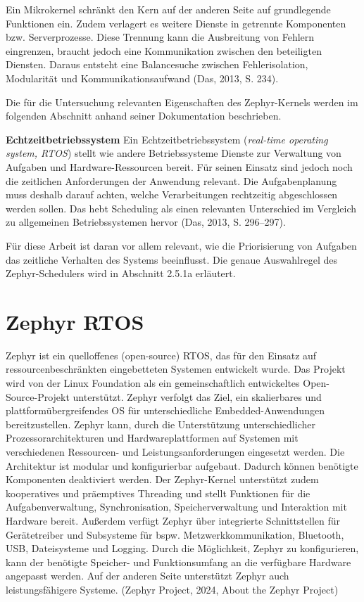 Ein Mikrokernel schr{\"a}nkt den Kern auf der anderen Seite auf grundlegende Funktionen ein. Zudem verlagert es weitere Dienste in getrennte Komponenten bzw. Serverprozesse. Diese Trennung kann die Ausbreitung von Fehlern eingrenzen, braucht jedoch eine Kommunikation zwischen den beteiligten Diensten. Daraus entsteht eine Balancesuche zwischen Fehlerisolation, Modularit{\"a}t und Kommunikationsaufwand (Das, 2013, S. 234).

Die f{\"u}r die Untersuchung relevanten Eigenschaften des Zephyr-Kernels werden im folgenden Abschnitt anhand seiner Dokumentation beschrieben.

\textbf{Echtzeitbetriebssystem} Ein Echtzeitbetriebssystem (\emph{real-time operating system, RTOS}) stellt wie andere Betriebssysteme Dienste zur Verwaltung von Aufgaben und Hardware-Ressourcen bereit. F{\"u}r seinen Einsatz sind jedoch noch die zeitlichen Anforderungen der Anwendung relevant. Die Aufgabenplanung muss deshalb darauf achten, welche Verarbeitungen rechtzeitig abgeschlossen werden sollen. Das hebt Scheduling als einen relevanten Unterschied im Vergleich zu allgemeinen Betriebssystemen hervor (Das, 2013, S. 296--297).

F{\"u}r diese Arbeit ist daran vor allem relevant, wie die Priorisierung von Aufgaben das zeitliche Verhalten des Systems beeinflusst. Die genaue Auswahlregel des Zephyr-Schedulers wird in Abschnitt 2.5.1a erl{\"a}utert.

\section{Zephyr RTOS}
Zephyr ist ein quelloffenes (open-source) RTOS, das f{\"u}r den Einsatz auf ressourcenbeschr{\"a}nkten eingebetteten Systemen entwickelt wurde. Das Projekt wird von der Linux Foundation als ein gemeinschaftlich entwickeltes Open-Source-Projekt unterst{\"u}tzt. Zephyr verfolgt das Ziel, ein skalierbares und plattform{\"u}bergreifendes OS f{\"u}r unterschiedliche Embedded-Anwendungen bereitzustellen. Zephyr kann, durch die Unterst{\"u}tzung unterschiedlicher Prozessorarchitekturen und Hardwareplattformen auf Systemen mit verschiedenen Ressourcen- und Leistungsanforderungen eingesetzt werden. Die Architektur ist modular und konfigurierbar aufgebaut. Dadurch k{\"o}nnen ben{\"o}tigte Komponenten deaktiviert werden. Der Zephyr-Kernel unterst{\"u}tzt zudem kooperatives und pr{\"a}emptives Threading und stellt Funktionen f{\"u}r die Aufgabenverwaltung, Synchronisation, Speicherverwaltung und Interaktion mit Hardware bereit. Au{\ss}erdem verf{\"u}gt Zephyr {\"u}ber integrierte Schnittstellen f{\"u}r Ger{\"a}tetreiber und Subsysteme f{\"u}r bspw. Metzwerkkommunikation, Bluetooth, USB, Dateisysteme und Logging. Durch die M{\"o}glichkeit, Zephyr zu konfigurieren, kann der ben{\"o}tigte Speicher- und Funktionsumfang an die verf{\"u}gbare Hardware angepasst werden. Auf der anderen Seite unterst{\"u}tzt Zephyr auch leistungsf{\"a}higere Systeme. (Zephyr Project, 2024, \glqq{}About the Zephyr Project\grqq{})

